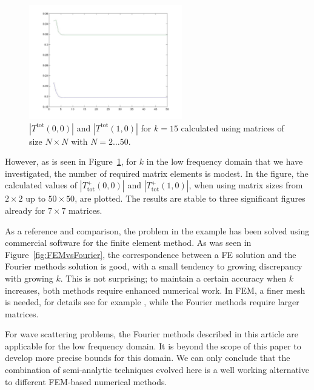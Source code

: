 \documentclass[numreferences]{kluwer}
\providecommand{\abs}[1]{\left\lvert#1\right\rvert}
\newcommand{\Ttot}{T^+_{\text{tot}}}
\begin{document}
\begin{figure}[htb]
  \centering
  \includegraphics[keepaspectratio=false,width=0.7\linewidth,height=5cm]{T_N}
  \caption{$\abs{T^{\text{tot}}(0,0)}$ and $\abs{T^{\text{tot}}(1,0)}$
    for $k=15$ calculated using matrices of size $N\times N$ with
    $N=2\dots50$.}
  \label{fig:T_N}
\end{figure}

However, as is seen in Figure~\ref{fig:T_N}, for $k$ in the low
frequency domain that we have investigated, the number of required
matrix elements is modest.  In the figure, the calculated values of
$\abs{\Ttot(0,0)}$ and $\abs{\Ttot(1,0)}$, when using matrix sizes
from $2\times2$ up to $50\times50$, are plotted. The results are
stable to three significant figures already for $7\times7$ matrices.

As a reference and comparison, the problem in the example has been
solved using commercial software for the finite element method.
As was seen in Figure~\ref{fig:FEMvsFourier}, the
correspondence between a FE solution and the Fourier methods solution
is good, with a small tendency to growing discrepancy with growing
$k$. This is not surprising; to maintain a certain accuracy when $k$
increases, both methods require enhanced numerical work. In FEM, a
finer mesh is needed, for details see for example
\cite{Ihlenburg:1998}, while the Fourier methods require larger
matrices.

For wave scattering problems, the Fourier methods described in this
article are applicable for the low frequency domain.
It is beyond the scope of this paper to develop more precise bounds
for this domain. We can only conclude that the combination of
semi-analytic techniques evolved here is a well working
alternative to different FEM-based numerical methods.



\end{document}
